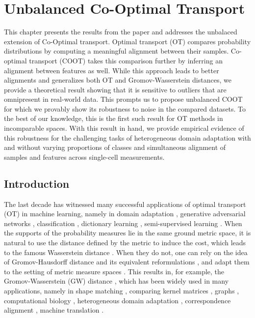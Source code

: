 
\chapter[Unbalanced Co-Optimal Transport]{Unbalanced Co-Optimal Transport}

\localtableofcontents*


This chapter presents the results from the paper \citep{Tran23} and addresses the unbalaced extension
of Co-Optimal transport.
Optimal transport (OT) compares probability distributions by computing a meaningful alignment
between their samples. Co-optimal transport (COOT) takes this comparison further
by inferring an alignment between features as well. While this approach leads to
better alignments and generalizes both OT and Gromov-Wasserstein distances,
we provide a theoretical result showing that it is sensitive to outliers
that are omnipresent in real-world data. This prompts us to propose unbalanced COOT
for which we provably show its robustness to noise in the compared datasets.
To the best of our knowledge, this is the first such result for OT methods in incomparable spaces.
With this result in hand, we provide empirical evidence of this robustness
for the challenging tasks of heterogeneous domain adaptation with and without
varying proportions of classes and simultaneous alignment of samples and features across
single-cell measurements.

\section{Introduction}

The last decade has witnessed many successful applications of optimal
transport (OT) \citep{Monge81,Kanto42} in machine learning, namely in domain adaptation \citep{Courty16}, generative adversarial networks \citep{Arjovsky17},
classification \citep{Frogner15}, dictionary learning \citep{Rolet16},
semi-supervised learning \citep{Solomon14}. When the
supports of the probability measures lie in the same ground metric space, it is natural to use the distance defined by the metric
to induce the cost, which leads to the famous Wasserstein distance \citep{Villani03}. When they do not, one can rely on the idea of Gromov-Hausdorff distance \citep{Gromov81} and its equivalent reformulations \citep{Gromov99,Kalton99,Burago01}, and adapt them to the setting of metric measure spaces \citep{Gromov99}. This results in, for example, the Gromov-Wasserstein
(GW) distance \citep{Memoli07,Memoli11,Sturm12}, which has been widely used in many applications, namely in shape matching \citep{Memoli11},
comparing kernel matrices \citep{Peyre16}, graphs \citep{Vayer19b,Xu19,Xu19b},
computational biology \citep{Demetci22}, heterogeneous domain adaptation \citep{Yan18},
correspondence alignment \citep{Solomon16}, machine translation \citep{Melis18}.

